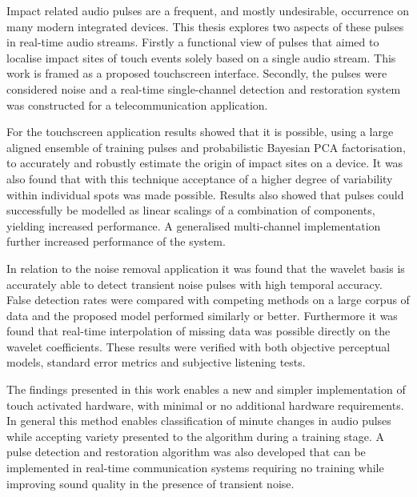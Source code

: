 

\begin{thesissummary}
Impact related audio pulses are a frequent, and mostly undesirable, occurrence on many modern integrated devices. This thesis explores two aspects of these pulses in real-time audio streams. Firstly a functional view of pulses that aimed to localise impact sites of touch events solely based on a single audio stream. This work is framed as a proposed touchscreen interface. Secondly, the pulses were considered noise and a real-time single-channel detection and restoration system was constructed for a telecommunication application.

For the touchscreen application results showed that it is possible, using a large aligned ensemble of training pulses and probabilistic Bayesian PCA factorisation, to accurately and robustly estimate the origin of impact sites on a device. It was also found that with this technique acceptance of a higher degree of variability within individual spots was made possible. Results also showed that pulses could successfully be modelled as linear scalings of a combination of components, yielding increased performance. A generalised multi-channel implementation further increased performance of the system.

In relation to the noise removal application it was found that the wavelet basis is accurately able to detect transient noise pulses with high temporal accuracy. False detection rates were compared with competing methods on a large corpus of data and the proposed model performed similarly or better. Furthermore it was found that real-time interpolation of missing data was possible directly on the wavelet coefficients. These results were verified with both objective perceptual models, standard error metrics and subjective listening tests.

The findings presented in this work enables a new and simpler implementation of touch activated hardware, with minimal or no additional hardware requirements. In general this method enables classification of minute changes in audio pulses while accepting variety presented to the algorithm during a training stage. A pulse detection and restoration algorithm was also developed that can be implemented in real-time communication systems requiring no training while improving sound quality in the presence of transient noise.

\end{thesissummary}





